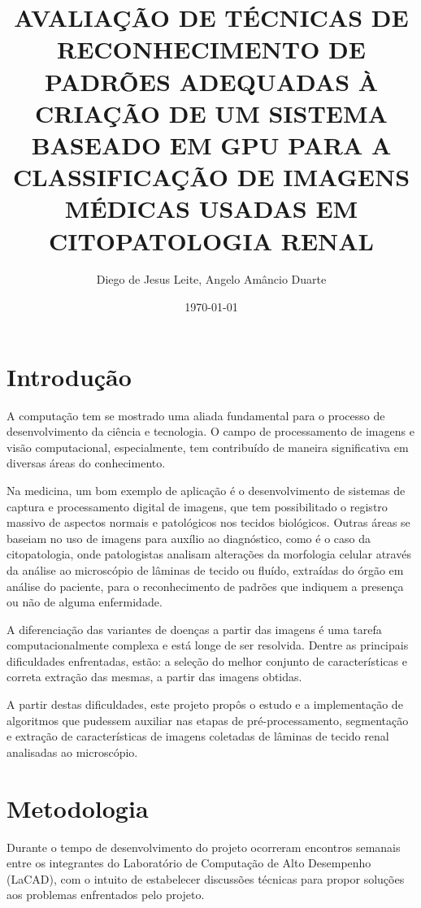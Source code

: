 \documentclass[final]{beamer}
\title
[XIX Seminário de Iniciação Científica da UEFS, Outubro 2015, Feira de Santana, Bahia] %
{ %
AVALIAÇÃO DE TÉCNICAS DE RECONHECIMENTO DE PADRÕES ADEQUADAS À CRIAÇÃO DE UM SISTEMA BASEADO EM GPU PARA A CLASSIFICAÇÃO DE IMAGENS MÉDICAS USADAS EM CITOPATOLOGIA RENAL
}
\author{ %
Diego de Jesus Leite\inst{1}, Angelo Amâncio Duarte\inst{1}
}
\institute
[Very Large University] %
{
\inst{1} Universidade Estadual de Feira de Santana\\[0.3ex]
diegojleite@gmail.com, angeloduarte@ecomp.uefs.br
}
\date{\today}
\begin{document}
\begin{frame}[t]
\begin{multicols}{2}

\section{Introdução}
A computação tem se mostrado uma aliada fundamental para o processo de desenvolvimento da ciência e tecnologia. O campo de processamento de imagens e visão computacional, especialmente, tem contribuído de maneira significativa em diversas áreas do conhecimento.
\newline

Na medicina, um bom exemplo de aplicação é o desenvolvimento de sistemas de captura e processamento digital de imagens, que tem possibilitado o registro massivo de aspectos normais e patológicos nos tecidos biológicos. Outras áreas se baseiam no uso de imagens para auxílio ao diagnóstico, como é o caso da citopatologia, onde patologistas analisam alterações da morfologia celular através da análise ao microscópio de lâminas de tecido ou fluído, extraídas do órgão em análise do paciente, para o reconhecimento de padrões que indiquem a presença ou não de alguma enfermidade.
\newline

A diferenciação das variantes de doenças a partir das imagens é uma tarefa computacionalmente complexa e está longe de ser resolvida. Dentre as principais dificuldades enfrentadas, estão: a seleção do melhor conjunto de características e correta extração das mesmas, a partir das imagens obtidas.
\newline

A partir destas dificuldades, este projeto propôs o estudo e a implementação de algoritmos que pudessem auxiliar nas etapas de pré-processamento, segmentação e extração de características de imagens coletadas de lâminas de tecido renal analisadas ao microscópio.

\section{Metodologia}

Durante o tempo de desenvolvimento do projeto ocorreram encontros semanais entre os integrantes do Laboratório de Computação de Alto Desempenho (LaCAD), com o intuito de estabelecer discussões técnicas para propor soluções aos problemas enfrentados pelo projeto.
\newline


\end{multicols}
\end{frame}
\end{document}
